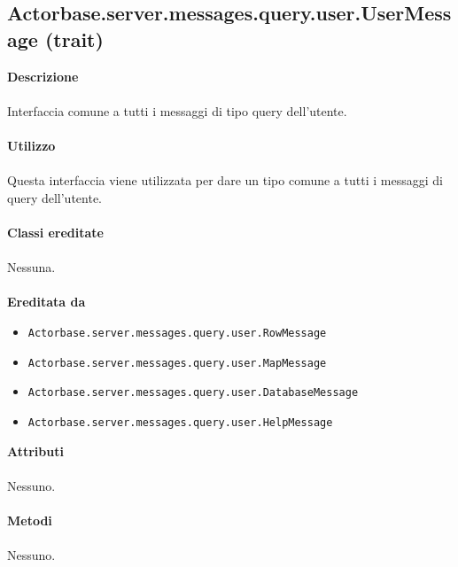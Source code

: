 \documentclass[a4paper]{article}
\begin{document}
	\subsection{Actorbase.server.messages.query.user.UserMessage (trait)}
		\textbf{Descrizione}
			\\ \\
			Interfaccia comune a tutti i messaggi di tipo query dell'utente.
			\\ \\
		\textbf{Utilizzo}
			\\ \\
			Questa interfaccia viene utilizzata per dare un tipo comune a tutti i messaggi di query dell'utente.
			\\ \\
		\textbf{Classi ereditate}
			\\ \\
			Nessuna.
			\\ \\
		\textbf{Ereditata da}
			\begin{itemize}
				\item \texttt{Actorbase.server.messages.query.user.RowMessage }
				\item \texttt{Actorbase.server.messages.query.user.MapMessage }
				\item \texttt{Actorbase.server.messages.query.user.DatabaseMessage }
				\item \texttt{Actorbase.server.messages.query.user.HelpMessage }
			\end{itemize}
		\textbf{Attributi}
			\\ \\
			Nessuno.
			\\ \\
		\textbf{Metodi}
			\\ \\
			Nessuno.	
			
\end{document}
